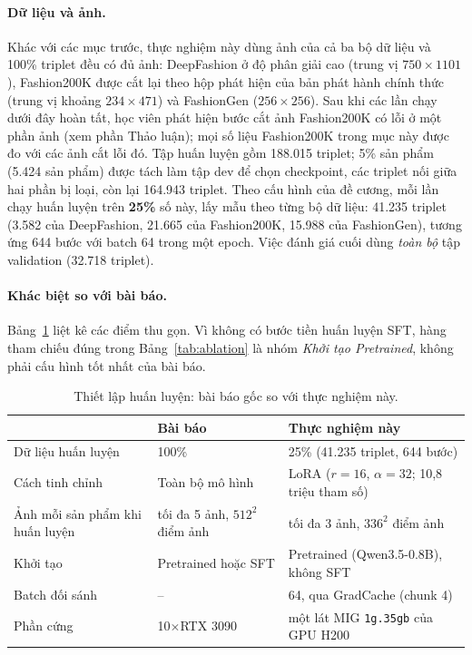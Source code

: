 \paragraph{Dữ liệu và ảnh.} Khác với các mục trước, thực nghiệm này dùng ảnh của cả ba bộ dữ liệu và 100\% triplet đều có đủ ảnh: DeepFashion ở độ phân giải cao (trung vị $750 \times 1101$), Fashion200K được cắt lại theo hộp phát hiện của bản phát hành chính thức (trung vị khoảng $234 \times 471$) và FashionGen ($256 \times 256$). Sau khi các lần chạy dưới đây hoàn tất, học viên phát hiện bước cắt ảnh Fashion200K có lỗi ở một phần ảnh (xem phần Thảo luận); mọi số liệu Fashion200K trong mục này được đo với các ảnh cắt lỗi đó. Tập huấn luyện gồm 188.015 triplet; 5\% sản phẩm (5.424 sản phẩm) được tách làm tập dev để chọn checkpoint, các triplet nối giữa hai phần bị loại, còn lại 164.943 triplet. Theo cấu hình của đề cương, mỗi lần chạy huấn luyện trên \textbf{25\%} số này, lấy mẫu theo từng bộ dữ liệu: 41.235 triplet (3.582 của DeepFashion, 21.665 của Fashion200K, 15.988 của FashionGen), tương ứng 644 bước với batch 64 trong một epoch. Việc đánh giá cuối dùng \emph{toàn bộ} tập validation (32.718 triplet).

\paragraph{Khác biệt so với bài báo.} Bảng~\ref{tab:train-setup} liệt kê các điểm thu gọn. Vì không có bước tiền huấn luyện SFT, hàng tham chiếu đúng trong Bảng~\ref{tab:ablation} là nhóm \emph{Khởi tạo Pretrained}, không phải cấu hình tốt nhất của bài báo.

\begin{table}[h]
\centering
\caption{Thiết lập huấn luyện: bài báo gốc so với thực nghiệm này.}
\label{tab:train-setup}
\small
\begin{tabular}{p{3.6cm}p{4.2cm}p{5.4cm}}
\toprule
& Bài báo & Thực nghiệm này \\
\midrule
Dữ liệu huấn luyện & 100\% & 25\% (41.235 triplet, 644 bước) \\
Cách tinh chỉnh & Toàn bộ mô hình & LoRA ($r = 16$, $\alpha = 32$; 10,8 triệu tham số) \\
Ảnh mỗi sản phẩm khi huấn luyện & tối đa 5 ảnh, $512^2$ điểm ảnh & tối đa 3 ảnh, $336^2$ điểm ảnh \\
Khởi tạo & Pretrained hoặc SFT & Pretrained (Qwen3.5-0.8B), không SFT \\
Batch đối sánh & -- & 64, qua GradCache (chunk 4) \\
Phần cứng & 10$\times$RTX 3090 & một lát MIG \texttt{1g.35gb} của GPU H200 \\
\bottomrule
\end{tabular}
\end{table}

